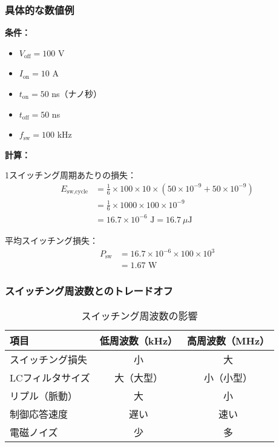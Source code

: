 \subsubsection{具体的な数値例}

\begin{screen}
\textbf{条件：}
\begin{itemize}
\item $V_{\text{off}} = 100$ V
\item $I_{\text{on}} = 10$ A
\item $t_{\text{on}} = 50$ ns（ナノ秒）
\item $t_{\text{off}} = 50$ ns
\item $f_{\text{sw}} = 100$ kHz
\end{itemize}

\textbf{計算：}

1スイッチング周期あたりの損失：
\begin{align}
E_{\text{sw,cycle}} &= \frac{1}{6} \times 100 \times 10 \times (50 \times 10^{-9} + 50 \times 10^{-9}) \\
&= \frac{1}{6} \times 1000 \times 100 \times 10^{-9} \\
&= 16.7 \times 10^{-6} \text{ J} = 16.7~\mu\text{J}
\end{align}

平均スイッチング損失：
\begin{align}
P_{\text{sw}} &= 16.7 \times 10^{-6} \times 100 \times 10^3 \\
&= 1.67 \text{ W}
\end{align}
\end{screen}

\subsubsection{スイッチング周波数とのトレードオフ}

\begin{table}[H]
\centering
\caption{スイッチング周波数の影響}
\begin{tabular}{|l|c|c|}
\hline
\textbf{項目} & \textbf{低周波数（kHz）} & \textbf{高周波数（MHz）} \\
\hline
\hline
スイッチング損失 & 小 & 大 \\
\hline
LCフィルタサイズ & 大（大型） & 小（小型） \\
\hline
リプル（脈動） & 大 & 小 \\
\hline
制御応答速度 & 遅い & 速い \\
\hline
電磁ノイズ & 少 & 多 \\
\hline
\end{tabular}
\end{table}

